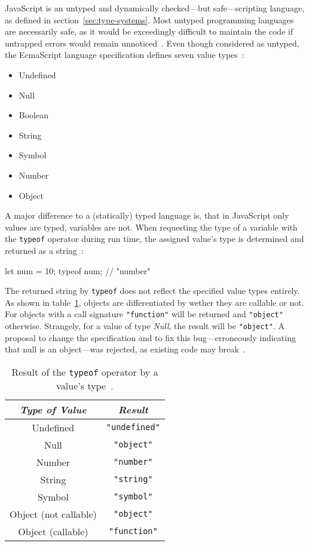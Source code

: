 JavaScript is an untyped and dynamically checked---but safe---scripting language, as defined in section~\ref{sec:type-systems}. Most untyped programming languages are necessarily safe, as it would be exceedingly difficult to maintain the code if untrapped errors would remain unnoticed~\cite[p.~4]{TypeSystems:Cardelli:2004}. Even though considered as untyped, the EcmaScript language specification defines seven value types~\cite[p.~16]{ES6Spec:Ecma:2015}:
\begin{itemize}
  \item Undefined
  \item Null
  \item Boolean
  \item String
  \item Symbol
  \item Number
  \item Object
\end{itemize}
A major difference to a (statically) typed language is, that in JavaScript only values are typed, variables are not. When requesting the type of a variable with the \texttt{typeof} operator during run time, the assigned value's type is determined and returned as a string~\cite[p.~30]{YDKJS:UpAndGoing:Simpson:2015}:
\begin{JsCode}[numbers=none]
let num = 10;
typeof num; // "number"
\end{JsCode}
The returned string by \texttt{typeof} does not reflect the specified value types entirely. As shown in table~\ref{tab:typeof}, objects are differentiated by wether they are callable or not. For objects with a call signature \texttt{"function"} will be returned and \texttt{"object"} otherwise. Strangely, for a value of type \emph{Null}, the result will be \texttt{"object"}. A proposal to change the specification and to fix this bug---erroneously indicating that null is an object---was rejected, as existing code may break~\cite{TypeofNull:Smith:2013, typeof:MDN:2017}.

\begin{table}
\caption{Result of the \texttt{typeof} operator by a value's type~\cite[p.~164]{ES6Spec:Ecma:2015}.}
\label{tab:typeof}
\centering
  \setlength{\tabcolsep}{5mm} %
  \def\arraystretch{1.25} %
  \small
  \begin{tabular}{|c|c|}
    \hline
    \emph{Type of Value} & \emph{Result} \\
    \hline \hline
    Undefined & \texttt{"undefined"} \\
    \hline
    Null & \texttt{"object"} \\
    \hline
    Number & \texttt{"number"} \\
    \hline
    String & \texttt{"string"} \\
    \hline
    Symbol & \texttt{"symbol"} \\
    \hline
    Object (not callable) & \texttt{"object"} \\
    \hline
    Object (callable) & \texttt{"function"} \\
    \hline
  \end{tabular}
\end{table}

